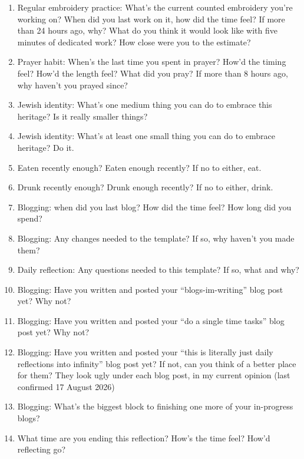 \documentclass[12pt]{article}
\newcommand{\say}[1]{``#1''}
\renewcommand{\,}{\textsuperscript{,}}
\begin{document}
\begin{enumerate}
\item Regular embroidery practice: What's the current counted embroidery you're working on? When did you last work on it, how did the time feel? If more than 24 hours ago, why? What do you think it would look like with five minutes of dedicated work? How close were you to the estimate?

\item Prayer habit: When's the last time you spent in prayer? How'd the timing feel? How'd the length feel? What did you pray? If more than 8 hours ago, why haven't you prayed since?

\item Jewish identity: What's one medium thing you can do to embrace this heritage? Is it really smaller things?

\item Jewish identity: What's at least one small thing you can do to embrace heritage? Do it.

\item Eaten recently enough? Eaten enough recently? If no to either, eat.

\item Drunk recently enough? Drunk enough recently? If no to either, drink.

\item Blogging: when did you last blog? How did the time feel? How long did you spend?

\item Blogging: Any changes needed to the template? If so, why haven't you made them?

\item Daily reflection: Any questions needed to this template? If so, what and why?

\item Blogging: Have you written and posted your \say{blogs-im-writing} blog post yet? Why not?

\item Blogging: Have you written and posted your \say{do a single time tasks} blog post yet? Why not?

\item Blogging: Have you written and posted your \say{this is literally just daily reflections into infinity} blog post yet? If not, can you think of a better place for them? They look ugly under each blog post, in my current opinion (last confirmed 17 August 2026)

\item Blogging: What's the biggest block to finishing one more of your in-progress blogs?

\item What time are you ending this reflection? How's the time feel? How'd reflecting go?

\end{enumerate} 
 
\end{document}
